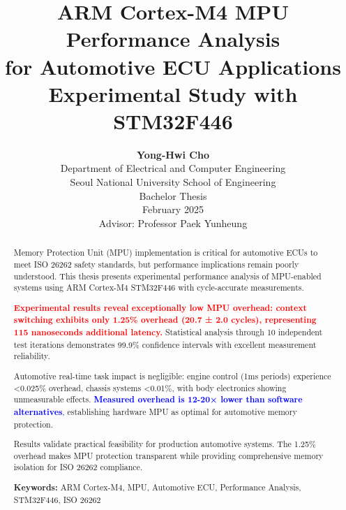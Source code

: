 \documentclass[12pt,a4paper,oneside]{report}
\title{
    \textbf{\LARGE ARM Cortex-M4 MPU Performance Analysis\\
    for Automotive ECU Applications}\\
    \vspace{0.3cm}
    \large{Experimental Study with STM32F446}
}
\author{
    \textbf{Yong-Hwi Cho}\\
    \vspace{0.5cm}
    Department of Electrical and Computer Engineering\\
    Seoul National University School of Engineering\\
    \vspace{0.5cm}
    Bachelor Thesis\\
    February 2025\\
    \vspace{0.5cm}
    \small{Advisor: Professor Paek Yunheung}
}
\date{}
\newcommand{\keyresult}[1]{\textbf{\textcolor{red}{#1}}}
\newcommand{\measurement}[1]{\textbf{\textcolor{blue}{#1}}}
\begin{document}
\maketitle
\thispagestyle{empty}

\newpage
\begin{abstract}
\vspace{1cm}

Memory Protection Unit (MPU) implementation is critical for automotive ECUs to meet ISO 26262 safety standards, but performance implications remain poorly understood. This thesis presents experimental performance analysis of MPU-enabled systems using ARM Cortex-M4 STM32F446 with cycle-accurate measurements.

\keyresult{Experimental results reveal exceptionally low MPU overhead: context switching exhibits only 1.25\% overhead (20.7 ± 2.0 cycles), representing 115 nanoseconds additional latency.} Statistical analysis through 10 independent test iterations demonstrates 99.9\% confidence intervals with excellent measurement reliability.

Automotive real-time task impact is negligible: engine control (1ms periods) experience <0.025\% overhead, chassis systems <0.01\%, with body electronics showing unmeasurable effects. \measurement{Measured overhead is 12-20× lower than software alternatives}, establishing hardware MPU as optimal for automotive memory protection.

Results validate practical feasibility for production automotive systems. The 1.25\% overhead makes MPU protection transparent while providing comprehensive memory isolation for ISO 26262 compliance.

\vspace{0.5cm}
\textbf{Keywords:} ARM Cortex-M4, MPU, Automotive ECU, Performance Analysis, STM32F446, ISO 26262

\end{abstract}

\newpage
\tableofcontents
\newpage
\listoffigures
\newpage
\listoftables

\newpage
\setcounter{page}{1}

\pagestyle{fancy}
\fancyhead[L]{\leftmark}
\fancyhead[R]{\thepage}
\fancyhead[C]{}
\fancyfoot{}








\end{document}
